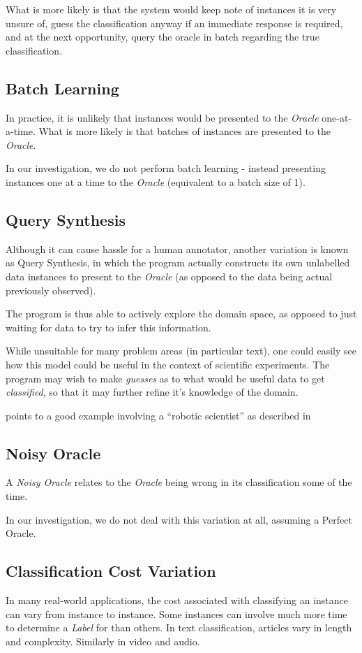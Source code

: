 \documentclass[a4paper,11pt]{report}
\begin{document}
What is more likely is that the system would keep note of instances it is very unsure of, guess the classification anyway if an immediate response is required, and at the next opportunity, query the oracle in batch regarding the true classification.

\subsection{Batch Learning}
In practice, it is unlikely that instances would be presented to the \emph{Oracle} one-at-a-time. What is more likely is that batches of instances are presented to the \emph{Oracle}.

In our investigation, we do not perform batch learning - instead presenting instances one at a time to the \emph{Oracle} (equivalent to a batch size of 1).

\subsection{Query Synthesis}
Although it can cause hassle for a human annotator, another variation is known as Query Synthesis, in which the program actually constructs its own unlabelled data instances to present to the \emph{Oracle} (as opposed to the data being actual previously observed).

The program is thus able to actively explore the domain space, as opposed to just waiting for data to try to infer this information.

While unsuitable for many problem areas (in particular text), one could easily see how this model could be useful in the context of scientific experiments. The program may wish to make \emph{guesses} as to what would be useful data to get \emph{classified}, so that it may further refine it's knowledge of the domain.

\citep{Settles2010} points to a good example involving a ``robotic scientist'' as described in \citep{King2009}

\subsection{Noisy Oracle}
A \emph{Noisy Oracle} relates to the \emph{Oracle} being wrong in its classification some of the time.

In our investigation, we do not deal with this variation at all, assuming a Perfect Oracle.

\subsection{Classification Cost Variation}
In many real-world applications, the cost associated with classifying an instance can vary from instance to instance. Some instances can involve much more time to determine a \emph{Label} for than others. In text classification, articles vary in length and complexity. Similarly in video and audio.
\end{document}
